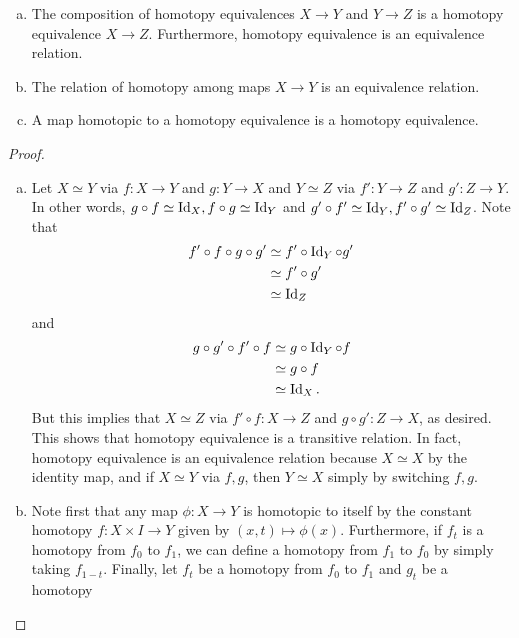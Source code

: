 \documentclass{../../mathnotes}
\begin{document}
\begin{prop}\hspace{1mm}
    \begin{enumerate}[(a)]
        \item The composition of homotopy equivalences $X\to Y$ and $Y\to Z$ is a homotopy equivalence
            $X\to Z$. Furthermore, homotopy equivalence is an equivalence relation.
        \item The relation of homotopy among maps $X\to Y$ is an equivalence relation.
        \item A map homotopic to a homotopy equivalence is a homotopy equivalence.
    \end{enumerate}
\end{prop}
\begin{proof}\hspace{1mm}
    \begin{enumerate}[(a)]
        \item Let $X\simeq Y$ via $f:X\to Y$ and $g:Y\to X$ and $Y\simeq Z$ via $f':Y\to Z$ and $g':Z\to Y$.
            In other words, $g\circ f\simeq\operatorname{Id}_X,f\circ g\simeq\operatorname{Id}_Y$ and $g'\circ f'\simeq\operatorname{Id}_Y,f'\circ g'\simeq\operatorname{Id}_Z$.
            Note that
            \begin{align*}
                f'\circ f\circ g\circ g'&\simeq f'\circ \operatorname{Id}_Y\circ g'\\
                &\simeq f'\circ g'\\
                &\simeq \operatorname{Id}_Z
            \end{align*}
            and
            \begin{align*}
                g\circ g'\circ f'\circ f&\simeq g\circ\operatorname{Id}_Y\circ f\\
                &\simeq g\circ f\\
                &\simeq \operatorname{Id}_X.
            \end{align*}
            But this implies that $X\simeq Z$ via $f'\circ f:X\to Z$ and $g\circ g':Z\to X$, as desired. This shows that
            homotopy equivalence is a transitive relation. In fact, homotopy equivalence is an equivalence relation because
            $X\simeq X$ by the identity map, and if $X\simeq Y$ via $f,g$, then $Y\simeq X$ simply by switching $f,g$.
        \item Note first that any map $\phi:X\to Y$ is homotopic to itself by the constant homotopy $f:X\times I\to Y$ given by
            $(x,t)\mapsto\phi(x)$. Furthermore, if $f_t$ is a homotopy from $f_0$ to $f_1$, we can define a homotopy from $f_1$
            to $f_0$ by simply taking $f_{1-t}$. Finally, let $f_t$ be a homotopy from $f_0$ to $f_1$ and $g_t$ be a homotopy

\end{enumerate}
\end{proof}
\end{document}
